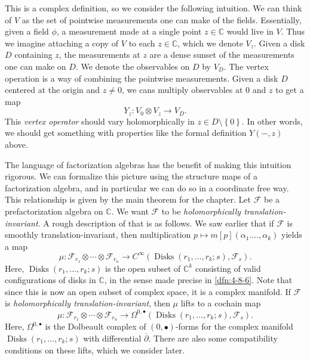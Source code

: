 This is a complex definition, so we consider the following intuition. We can think of $V$ as the set of pointwise measurements one can make of the fields. Essentially, given a field $\phi $, a measurement made at a single point $z\in\mathbb{C} $ would live in $V$. Thus we imagine attaching a copy of $V$ to each $z\in\mathbb{C} $, which we denote $V_z$. Given a disk $D$ containing $z$, the measurements at $z$ are a dense sunset of the measurements one can make on $D$. We denote the observables on $D$ by $V_D$. The vertex operation is a way of combining the pointwise measurements. Given a disk $D$ centered at the origin and $z\neq 0$, we cans multiply observables at 0 and $z$ to get a map
\[
	Y_z : V_0 \otimes V_z \to V_D
.\]
This \emph{vertex operator} should vary holomorphically in $z\in D\setminus \left\{ 0 \right\} $. In other words, we should get something with properties like the formal definition $Y(-,z)$ above.

The language of factorization algebras has the benefit of making this intuition rigorous. We can formalize this picture using the structure maps of a factorization algebra, and in particular we can do so in a coordinate free way. This relationship is given by the main theorem for the chapter. Let $\mathcal{F} $ be a prefactorization algebra on $\mathbb{C} $. We want $\mathcal{F} $ to be \emph{holomorphically translation-invariant}. A rough description of that is as follows. We saw earlier that if $\mathcal{F} $ is smoothly translation-invariant, then multiplication $p\mapsto m[p](\alpha_1. \ldots ,\alpha _k)$ yields a map
\[
	\mu : \mathcal{F} _{r_1} \otimes \cdots \otimes \mathcal{F} _{r_n}  \to C^\infty \left( \operatorname{Disks} (r_1, \ldots , r_k ; s),\mathcal{F} _s \right) 
.\]
Here, $\operatorname{Disks}(r_1, \ldots ,r_k ; s)$ is the open subset of $\mathbb{C} ^k$ consisting of valid configurations of disks in $\mathbb{C} $, in the sense made precise in \cref{dfn:4-8-6}. Note that since this is now an open subset of complex space, it is a complex manifold. If $\mathcal{F} $ is \emph{holomorphically translation-invariant}, then $\mu $ lifts to a cochain map
\[
	\mu : \mathcal{F} _{r_1} \otimes \cdots \otimes \mathcal{F} _{r_n}  \to \Omega ^{0,\bullet} \left( \operatorname{Disks} (r_1, \ldots ,r_k ; s),\mathcal{F} _s \right) 
.\]
Here, $\Omega ^{0,\bullet} $ is the Dolbeault complex of $(0,\bullet)$-forms for the complex manifold $\operatorname{Disks} (r_1, \ldots ,r_k ; s)$ with differential $\overline{\partial } $. There are also some compatibility conditions on these lifts, which we consider later.

